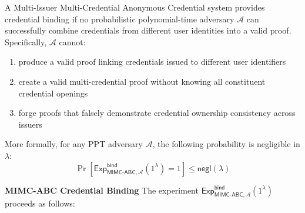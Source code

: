 \begin{definition}
A Multi-Issuer Multi-Credential Anonymous Credential system provides credential binding if no probabilistic polynomial-time adversary $\mathcal{A}$ can successfully combine credentials from different user identities into a valid proof. Specifically, $\mathcal{A}$ cannot:
\begin{enumerate}
    \item produce a valid proof linking credentials issued to different user identifiers
    \item create a valid multi-credential proof without knowing all constituent credential openings
    \item forge proofs that falsely demonstrate credential ownership consistency across issuers
\end{enumerate}

\noindent More formally, for any PPT adversary $\mathcal{A}$, the following probability is negligible in $\lambda$:
\[ \Pr[\mathsf{Exp}^{\mathsf{bind}}_{\mathsf{MIMC\mbox{-}ABC},\mathcal{A}}(1^\lambda) = 1] \leq \mathsf{negl}(\lambda) \]
\end{definition}

\noindent \textbf{MIMC-ABC Credential Binding} 
The experiment $\mathsf{Exp}^{\mathsf{bind}}_{\mathsf{MIMC\mbox{-}ABC},\mathcal{A}}(1^\lambda)$ proceeds as follows:

